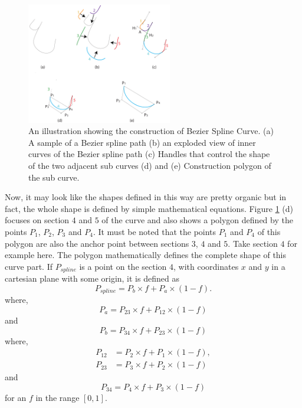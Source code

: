         \begin{figure}[!t]
            \centering
            \includegraphics[width=2.5in]{../Images/BezierSplineCurve.pdf}
            \caption{An illustration showing the construction of Bezier Spline Curve. (a) A sample of a Bezier spline path (b) an exploded view of inner curves of the Bezier spline path (c) Handles that control the shape of the two adjacent sub curves (d) and (e) Construction polygon of the sub curve.}
            \label{Fig:BezierSplines}
        \end{figure}

        Now, it may look like the shapes defined in this way are pretty organic but in fact, the whole shape is defined by simple mathematical equations. Figure \ref{Fig:BezierSplines} (d) focuses on section $4$ and $5$ of the curve and also shows a polygon defined by the points $P_1$, $P_2$, $P_3$ and  $P_4$. It must be noted that the points $P_1$ and $P_4$ of this polygon are also the anchor point between sections $3$, $4$ and $5$. Take section $4$ for example here. The polygon mathematically defines the complete shape of this curve part. If $P_{spline}$ is a point on the section $4$, with coordinates $x$ and $y$ in a cartesian plane with some origin, it is defined as
         \begin{equation}
         P_{spline}=P_b×f+P_a×(1 -f).
         \end{equation}
where,
\begin{equation}
P_a=P_{23}×f+P_{12}×(1 -f)
\end{equation}
and
\begin{equation}
P_b=P_{34}×f+P_{23}×(1 -f)
\end{equation}
where,
\begin{align}
P_{12}&=P_2×f+P_1×(1 -f), \\
P_{23}&=P_3×f+P_2×(1 -f)
\end{align}
and
\begin{equation}
P_{34}=P_4×f+P_3×(1 -f)
\end{equation}
for an $f$ in the range $[0, 1]$.

